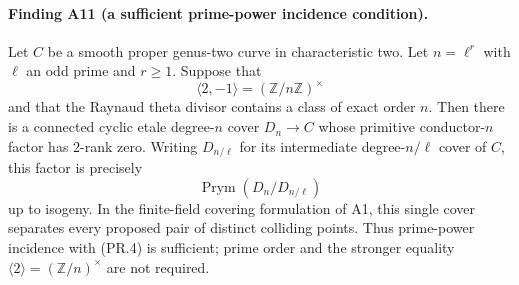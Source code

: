 \paragraph{Finding A11 (a sufficient prime-power incidence condition).}
Let $C$ be a smooth proper genus-two curve in characteristic two.
Let $n=\ell^r$ with $\ell$ an odd prime and $r\ge1$. Suppose that
\[
 \langle 2,-1\rangle=(\mathbb Z/n\mathbb Z)^\times
 \tag{PR.4}
\]
and that the Raynaud theta divisor contains a class of exact order
$n$. Then there is a connected cyclic etale degree-$n$ cover
$D_n\to C$ whose primitive conductor-$n$ factor has $2$-rank zero.
Writing $D_{n/\ell}$ for its intermediate degree-$n/\ell$ cover of
$C$, this factor is precisely
\[
 \operatorname{Prym}(D_n/D_{n/\ell})
\]
up to isogeny. In the finite-field covering formulation of A1, this
single cover separates every proposed pair of distinct colliding
points. Thus prime-power incidence with (PR.4) is sufficient; prime
order and the stronger equality $\langle2\rangle=(\mathbb Z/n)^\times$
are not required.

